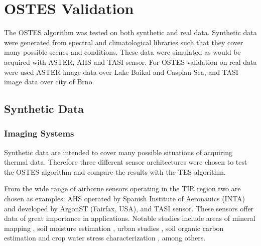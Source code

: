 \chapter{OSTES Validation}
\label{chap:OSTESValid}

The OSTES algorithm was tested on both synthetic and real data. Synthetic data were generated from spectral and climatological  libraries such that they cover many possible scenes and conditions. These data were simulated as would be acquired with ASTER, AHS and TASI sensor. For OSTES validation on real data were used ASTER image data over Lake Baikal and Caspian Sea, and TASI image data over city of Brno. 

\section{Synthetic Data}

\subsection*{Imaging Systems}

Synthetic data are intended to cover many possible situations of acquiring thermal data. Therefore three different sensor architectures were chosen to test the OSTES algorithm and compare the results with the TES algorithm.

From the wide range of airborne sensors operating in the TIR region two are chosen as examples: AHS operated by Spanish Institute of Aeronauics (INTA) and developed by ArgonST (Fairfax, USA), and TASI sensor. These sensors offer data of great importance in applications. Notable studies include areas of
mineral mapping \cite{NK14}, 
soil moisture estimation \cite{SF12}, 
urban studies \cite{SO12},
soil organic carbon estimation \cite{PC14} and
crop water stress characterization \cite{PP12},
among others.


